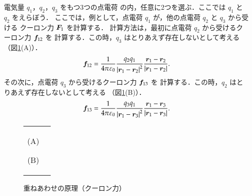         電気量 $q_{1}$，$q_{2}$，$q_{3}$ をもつ3つの点電荷
        の内，任意に2つを選ぶ．ここでは $q_{1}$ と $q_{2}$ をえらぼう．
        ここでは，例として，点電荷 $q_{1}$ が，他の点電荷 $q_{2}$ と $q_{3}$ から受ける
        クーロン力 $\boldsymbol{F}_{1}$ を計算する．
        計算方法は，最初に点電荷 $q_{2}$ から受けるクーロン力 $\boldsymbol{f}_{12}$ を
        計算する．この時，$q_{3}$ はとりあえず存在しないとして考える
        （図\ref{fig:EM_Coulomb_KasaneAwase02}(A)）．
            \begin{equation*}
                \boldsymbol{f}_{12} = \frac{1}{4\pi\varepsilon_{0}}
                           \frac{q_{2}q_{1}}{{|\boldsymbol{r}_{1} - \boldsymbol{r}_{2}|}^{2}}
                           \frac{\boldsymbol{r}_{1} - \boldsymbol{r}_{2}}{|\boldsymbol{r}_{1} - \boldsymbol{r}_{2}|}.
            \end{equation*}
        その次に，点電荷 $q_{3}$ から受けるクーロン力 $\boldsymbol{f}_{13}$ を
        計算する．この時，$q_{2}$ はとりあえず存在しないとして考える
        （図\ref{fig:EM_Coulomb_KasaneAwase02}(B)）．
            \begin{equation*}
                \boldsymbol{f}_{13} = \frac{1}{4\pi\varepsilon_{0}}
                           \frac{q_{3}q_{1}}{{|\boldsymbol{r}_{1} - \boldsymbol{r}_{3}|}^{2}}
                           \frac{\boldsymbol{r}_{1} - \boldsymbol{r}_{3}}{|\boldsymbol{r}_{1} - \boldsymbol{r}_{3}|}.
            \end{equation*}
        \begin{figure}[hbt]
            \begin{tabular}{cc}
                \begin{minipage}{0.5\hsize}
                    \begin{center}
                        {EM_Coulomb_KasaneAwase02a.pdf}

                        (A)
                    \end{center}
                \end{minipage}
                \begin{minipage}{0.5\hsize}
                    \begin{center}
                        {EM_Coulomb_KasaneAwase02b.pdf}

                        (B)
                    \end{center}
                \end{minipage}
            \end{tabular}
            \caption{重ねあわせの原理（クーロン力）}
            \label{fig:EM_Coulomb_KasaneAwase02}
        \end{figure}

